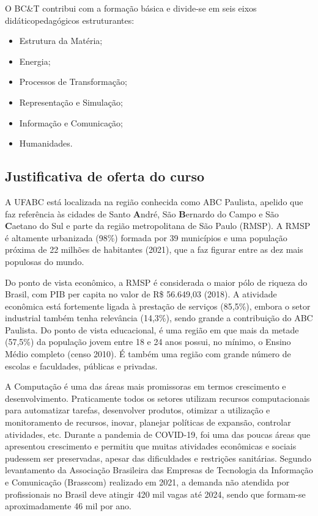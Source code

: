 O BC\&T contribui com a formação básica e divide-se em seis eixos
didáticopedagógicos estruturantes:
\begin{itemize}
    \item Estrutura da Matéria;
    \item Energia;
    \item Processos de Transformação;
    \item Representação e Simulação;
    \item Informação e Comunicação;
    \item Humanidades.
\end{itemize}


\subsection{Justificativa de oferta do curso}

A UFABC está localizada na região conhecida como ABC Paulista, apelido que faz
referência às cidades de Santo \textbf{A}ndré, São \textbf{B}ernardo do Campo e
São \textbf{C}aetano do Sul e parte da região metropolitana de São Paulo
(RMSP).
A RMSP é altamente urbanizada (98\%) formada por 39 municípios e uma população
próxima de 22 milhões de habitantes (2021), que a faz figurar entre as dez mais
populosas do mundo. 

Do ponto de vista econômico, a RMSP é considerada o maior pólo de riqueza do
Brasil, com PIB per capita no valor de R\$ 56.649,03 (2018).
A atividade econômica está fortemente ligada à prestação de serviços (85,5\%),
embora o setor industrial também tenha relevância (14,3\%), sendo grande a
contribuição do ABC Paulista. 
Do ponto de vista educacional, é uma região em que mais da metade (57,5\%) da
população jovem entre 18 e 24 anos possui, no mínimo, o Ensino Médio completo
(censo 2010).
É também uma região com grande número de escolas e faculdades, públicas e
privadas. 

A Computação é uma das áreas mais promissoras em termos crescimento e
desenvolvimento.
Praticamente todos os setores utilizam recursos computacionais para automatizar
tarefas, desenvolver produtos, otimizar a utilização e monitoramento de
recursos, inovar, planejar políticas de expansão, controlar atividades, etc.
Durante a pandemia de COVID-19, foi uma das poucas áreas que apresentou
crescimento e permitiu que muitas atividades econômicas e sociais pudessem ser
preservadas, apesar das dificuldades e restrições sanitárias.
Segundo levantamento da Associação Brasileira das Empresas de Tecnologia da
Informação e Comunicação (Brasscom) realizado em 2021, a demanda não atendida
por profissionais no Brasil deve atingir 420 mil vagas até 2024, sendo que
formam-se aproximadamente 46 mil por ano.

